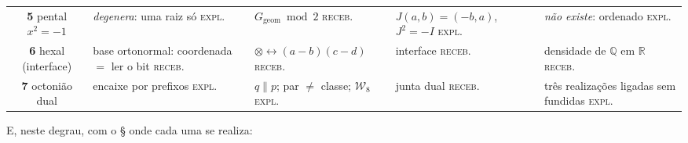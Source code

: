 \documentclass[11pt,a4paper]{article}
\newcommand{\Word}{\mathcal{W}}
\begin{document}
\begin{center}
\begin{tabular}{@{}cp{2.75cm}p{2.75cm}p{2.75cm}p{2.75cm}@{}}
\textbf{5} pental $x^{2}=-1$
 & \emph{degenera}: uma raiz só \hfill\textsc{expl.}
 & $G_{\mathrm{geom}}\bmod2$ \hfill\textsc{receb.}
 & $J(a,b)=(-b,a)$, $J^{2}=-I$ \hfill\textsc{expl.}
 & \emph{não existe}: ordenado \hfill\textsc{expl.} \\
\textbf{6} hexal (interface)
 & base ortonormal: coordenada $=$ ler o bit \hfill\textsc{receb.}
 & $\otimes\leftrightarrow(a-b)(c-d)$ \hfill\textsc{receb.}
 & interface \hfill\textsc{receb.}
 & densidade de $\mathbb{Q}$ em $\mathbb{R}$ \hfill\textsc{receb.} \\
\textbf{7} octonião dual
 & encaixe por prefixos \hfill\textsc{expl.}
 & $q\parallel p$; par $\neq$ classe; $\Word_8$ \hfill\textsc{expl.}
 & junta dual \hfill\textsc{receb.}
 & três realizações ligadas sem fundidas \hfill\textsc{expl.} \\
\bottomrule
\end{tabular}
\end{center}

\noindent E, neste degrau, com o § onde cada uma se realiza:
\end{document}
